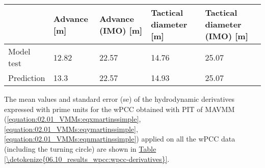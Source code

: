 \documentclass[review]{elsarticle}
\begin{document}
 \begin{savenotes}\sphinxattablestart
 \centering
 \sphinxthecaptionisattop
 \label{\detokenize{06.10_results_wpcc:tab-wpcc-advance}}
 \sphinxaftertopcaption
 \begin{tabulary}{\linewidth}[t]{|T|T|T|T|T|}
 \hline
 \sphinxstyletheadfamily &\sphinxstyletheadfamily 
 
 Advance {[}m{]}
 &\sphinxstyletheadfamily 
 
 Advance (IMO) {[}m{]}
 &\sphinxstyletheadfamily 
 
 Tactical diameter {[}m{]}
 &\sphinxstyletheadfamily 
 
 Tactical diameter (IMO) {[}m{]}
 \\
 \hline
 
 Model test
 &
 
 12.82
 &
 
 22.57
 &
 
 14.76
 &
 
 25.07
 \\
 \hline
 
 Prediction
 &
 
 13.3
 &
 
 22.57
 &
 
 14.93
 &
 
 25.07
 \\
 \hline
 \end{tabulary}
 \par
 \sphinxattableend\end{savenotes}

  
The mean values and standard error (se) of the hydrodynamic derivatives expressed with prime units for the wPCC obtained with PIT of MAVMM (\autoref{equation:02.01_VMMs:eqxmartinssimple},\autoref{equation:02.01_VMMs:eqymartinssimple}, \autoref{equation:02.01_VMMs:eqnmartinssimple}) applied on all the wPCC data (including the turning circle)  are shown in \hyperref[\detokenize{06.10_results_wpcc:wpcc-derivatives}]{Table \ref{\detokenize{06.10_results_wpcc:wpcc-derivatives}}}.
\end{document}
